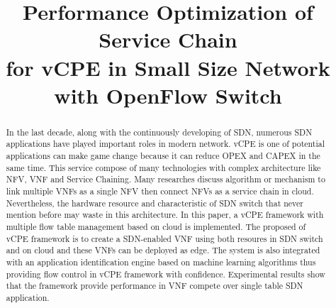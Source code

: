 \documentclass[journal]{IEEEtran}
\begin{document}
\title{Performance Optimization of Service Chain \\ for vCPE in Small Size Network \\ with OpenFlow Switch}

\author{

}


\maketitle

\begin{abstract}
In the last decade, along with the continuously developing of SDN, numerous SDN applications have played important roles in modern network. vCPE is one of potential applications can make game change because it can reduce OPEX and CAPEX in the same time. This service compose of many technologies with complex architecture like NFV, VNF and Service Chaining. Many researches discuss algorithm or mechanism to link multiple VNFs as a single NFV then connect NFVs as a service chain in cloud. Nevertheless, the hardware resource and characteristic of SDN switch that never mention before may waste in this architecture. In this paper, a vCPE framework with multiple flow table management based on cloud is implemented. The proposed of vCPE framework is to create a SDN-enabled VNF using both resoures in SDN switch and on cloud and these VNFs can be deployed as edge. The system is also integrated with an application identification engine based on machine learning algorithms thus providing flow control in vCPE framework with confidence. Experimental results show that the framework provide performance in VNF compete over single table SDN application.
\end{abstract}
\end{document}
